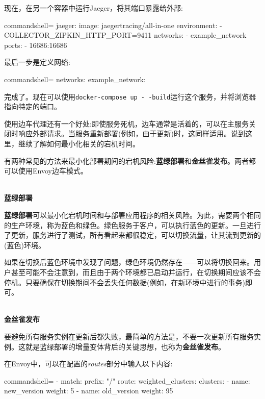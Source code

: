 现在，在另一个容器中运行Jaeger，将其端口暴露给外部:

\begin{tcblisting}{commandshell={}}
jaeger:
  image: jaegertracing/all-in-one
  environment:
    - COLLECTOR_ZIPKIN_HTTP_PORT=9411
  networks:
    - example_network
  ports:
    - 16686:16686
\end{tcblisting}

最后一步是定义网络:

\begin{tcblisting}{commandshell={}}
  networks:
    example_network: {}
\end{tcblisting}

完成了。现在可以使用\texttt{docker-compose up -\,-build}运行这个服务，并将浏览器指向特定的端口。

使用边车代理还有一个好处:即使服务死机，边车通常是活着的，可以在主服务关闭时响应外部请求。当服务重新部署(例如，由于更新)时，这同样适用。说到这里，继续了解如何最小化相关的宕机时间。


有两种常见的方法来最小化部署期间的宕机风险:\textbf{蓝绿部署}和\textbf{金丝雀发布}。两者都可以使用Envoy边车模式。

\hspace*{\fill} \\ %
\noindent
\textbf{蓝绿部署}

\textbf{蓝绿部署}可以最小化宕机时间和与部署应用程序的相关风险。为此，需要两个相同的生产环境，称为蓝色和绿色。绿色服务于客户，可以执行蓝色的更新。一旦进行了更新，服务进行了测试，所有看起来都很稳定，可以切换流量，让其流到更新的(蓝色)环境。

如果在切换后蓝色环境中发现了问题，绿色环境仍然存在——可以将切换回来。用户甚至可能不会注意到，而且由于两个环境都已启动并运行，在切换期间应该不会停机。只要确保在切换期间不会丢失任何数据(例如，在新环境中进行的事务)即可。

\hspace*{\fill} \\ %
\noindent
\textbf{金丝雀发布}

要避免所有服务实例在更新后都失败，最简单的方法是，不要一次更新所有服务实例。这就是蓝绿部署的增量变体背后的关键思想，也称为\textbf{金丝雀发布}。

在Envoy中，可以在配置的\textit{routes}部分中输入以下内容:

\begin{tcblisting}{commandshell={}}
- match:
    prefix: "/"
  route:
    weighted_clusters:
      clusters:
      - name: new_version
        weight: 5
      - name: old_version
        weight: 95
\end{tcblisting}

